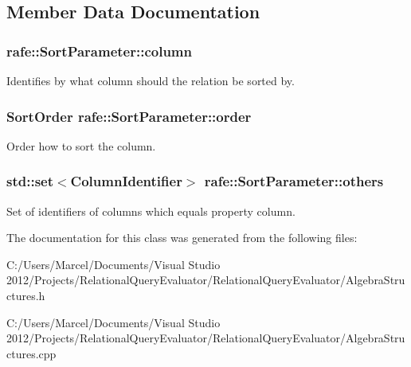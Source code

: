 \subsection{Member Data Documentation}
\hypertarget{classrafe_1_1_sort_parameter_ab28a61edbd40e46e55fac81024e5cdf8}{
\subsubsection[{column}]{ rafe\+::\+Sort\+Parameter\+::column}}\label{classrafe_1_1_sort_parameter_ab28a61edbd40e46e55fac81024e5cdf8}
Identifies by what column should the relation be sorted by. \hypertarget{classrafe_1_1_sort_parameter_ac4bb3225464a463206abfc4ef7a4a875}{
\subsubsection[{order}]{\setlength{\rightskip}{0pt plus 5cm}Sort\+Order rafe\+::\+Sort\+Parameter\+::order}}\label{classrafe_1_1_sort_parameter_ac4bb3225464a463206abfc4ef7a4a875}
Order how to sort the column. \hypertarget{classrafe_1_1_sort_parameter_ae8a1dda682edec1b98e928590763ba85}{
\subsubsection[{others}]{\setlength{\rightskip}{0pt plus 5cm}std\+::set$<${\bf Column\+Identifier}$>$ rafe\+::\+Sort\+Parameter\+::others}}\label{classrafe_1_1_sort_parameter_ae8a1dda682edec1b98e928590763ba85}
Set of identifiers of columns which equals property column. 

The documentation for this class was generated from the following files\+:\begin{DoxyCompactItemize}
\item 
C\+:/\+Users/\+Marcel/\+Documents/\+Visual Studio 2012/\+Projects/\+Relational\+Query\+Evaluator/\+Relational\+Query\+Evaluator/Algebra\+Structures.\+h\item 
C\+:/\+Users/\+Marcel/\+Documents/\+Visual Studio 2012/\+Projects/\+Relational\+Query\+Evaluator/\+Relational\+Query\+Evaluator/Algebra\+Structures.\+cpp\end{DoxyCompactItemize}
